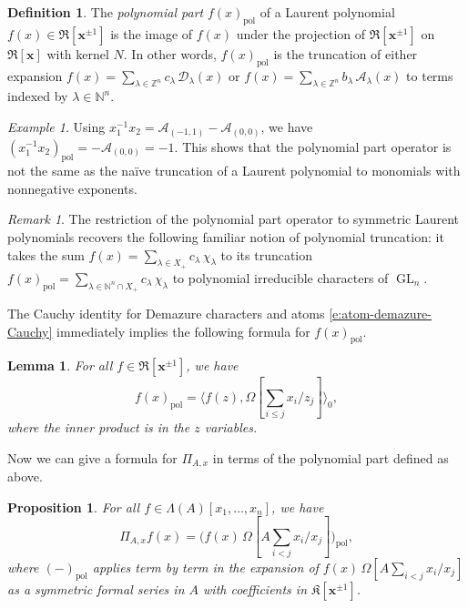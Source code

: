 \documentclass[12pt]{amsart}
\newtheorem{lemma}[thm]{Lemma}
\newtheorem{prop}[thm]{Proposition}
\theoremstyle{definition}
\newtheorem{defn}[thm]{Definition}
\theoremstyle{remark}
\newtheorem{example}[thm]{Example}
\newtheorem{remark}[thm]{Remark}
\newcommand{\NN}{{\mathbb N}}
\newcommand{\ZZ}{{\mathbb Z}}
\newcommand{\xx}{{\mathbf x}}
\newcommand{\Kfrak}{{\mathfrak K}}
\newcommand{\Rfrak}{{\mathfrak R}}
\newcommand{\Acal}{{\mathcal A}}
\newcommand{\Dcal}{{\mathcal D}}
\DeclareMathOperator{\pol}{pol}
\DeclareMathOperator{\GL}{GL}
\begin{document}
\begin{defn}\label{def:pol-part}
The {\em polynomial part} $f(x)_{\pol }$ of a Laurent polynomial
$f(x)\in \Rfrak [\xx ^{\pm 1}]$ is the image of $f(x)$ under the
projection of $\Rfrak [\xx ^{\pm 1}]$ on $\Rfrak [\xx ]$ with kernel
$N$.  In other words, $f(x)_{\pol }$ is the truncation of either
expansion $f(x) = \sum _{\lambda \in \ZZ ^{n}} c_{\lambda }\, \Dcal
_{\lambda }(x)$ or $f(x) = \sum _{\lambda \in \ZZ ^{n}} b_{\lambda }
\, \Acal _{\lambda }(x)$ to terms indexed by $\lambda \in \NN ^{n}$.
\end{defn}



\begin{example}
Using $x_1^{-1}x_2 = \Acal_{(-1, 1)} - \Acal_{(0,0)}$, we have
 $(x_1^{-1}x_2)_{\pol} = -\Acal_{(0,0)} = -1$.
This shows that the polynomial part operator is not the same as the na\"ive truncation of a Laurent
polynomial to monomials with nonnegative exponents.
\end{example}


\begin{remark}\label{rem:pol-part}
The restriction of the polynomial part operator to symmetric Laurent
polynomials recovers the following familiar notion of polynomial
truncation: it takes the sum $f(x) = \sum _{\lambda \in X_{+}}
c_{\lambda }\, \chi _{\lambda }$ to its truncation $f(x)_{\pol } =
\sum _{\lambda \in \NN ^{n}\cap X_{+}} c_{\lambda }\, \chi _{\lambda
}$ to polynomial irreducible characters of $\GL _{n}$.
\end{remark}


The Cauchy identity for Demazure characters and atoms
\eqref{e:atom-demazure-Cauchy} immediately implies the following
formula for $f(x)_{\pol }$.

\begin{lemma}\label{lem:pol-part}
For all $f\in \Rfrak [\xx ^{\pm 1}]$, we have
\begin{equation}\label{e:pol-part}
f(x)_{\pol } = \langle f(z), \Omega [\sum _{i\leq j} x_{i}/z_{j}]
\rangle _{0},
\end{equation}
where the inner product is in the $z$ variables.
\end{lemma}

Now we can give a formula for $\Pi _{A,x}$ in terms of the polynomial
part defined as above.


\begin{prop}\label{prop:PiA-via-pol}
For all $f\in \Lambda (A)[x_{1},\ldots,x_{n}]$, we have
\begin{equation}\label{e:PiA-via-pol}
\Pi _{A,x} f(x) = \bigl( f(x)\, \Omega [A \sum _{i<j} x_{i}/x_{j}]
\bigr)_{\pol },
\end{equation}
where $(-)_{\pol} $ applies term by term in the expansion of $f(x)\,
\Omega [A \sum _{i<j} x_{i}/x_{j}]$ as a symmetric formal series in
$A$ with coefficients in $\Kfrak [\xx ^{\pm 1}]$.
\end{prop}
\end{document}
